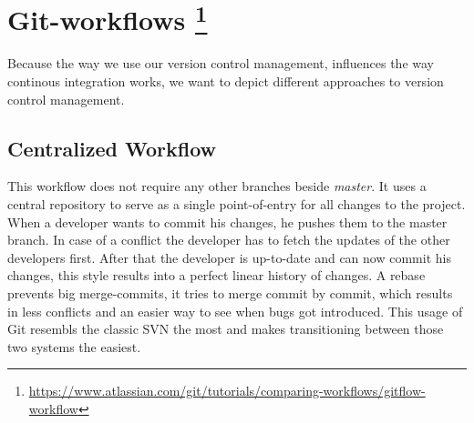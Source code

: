 \section{Git-workflows \footnote{\url{https://www.atlassian.com/git/tutorials/comparing-workflows/gitflow-workflow}}}

Because the way we use our version control management, influences the way continous integration works, we want to depict different approaches to version control management.

\subsection{Centralized Workflow}\label{sec:Centralized Workflow}
This workflow does not require any other branches beside \textit{master}. It uses a central repository to serve as a single point-of-entry for all changes to the project.
When a developer wants to commit his changes, he pushes them to the master branch. In case of a conflict the developer has to fetch the updates of the other developers first.
After that the developer is up-to-date and can now commit his changes, this style results into a perfect linear history of changes.
A rebase prevents big merge-commits, it tries to merge commit by commit, which results in less conflicts and an easier way to see when bugs got introduced.
This usage of Git resembls the classic SVN the most and makes transitioning between those two systems the easiest. \\

